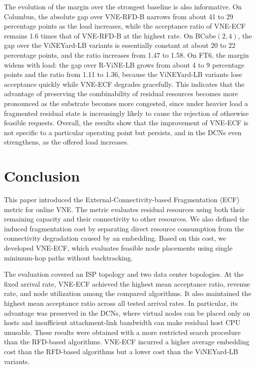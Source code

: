 \documentclass{ieeeaccess}
\newcommand{\ecf}{ECF}
\newcommand{\ecfvne}{VNE-ECF}
\begin{document}
The evolution of the margin over the strongest baseline is also informative. On Columbus, the
absolute gap over VNE-RFD-B narrows from about 41 to 29 percentage points as the load increases,
while the acceptance ratio of \ecfvne{} remains 1.6 times that of VNE-RFD-B at the highest rate. On
BCube$(2,4)$, the gap over the ViNEYard-LB variants is essentially constant at about 20 to 22 percentage
points, and the ratio increases from 1.47 to 1.58. On FT6, the margin widens with load: the gap
over R-ViNE-LB grows from about 4 to 9 percentage points and the ratio from 1.11 to 1.36, because the
ViNEYard-LB variants lose acceptance quickly while \ecfvne{} degrades gracefully. This indicates that
the advantage of preserving the combinability of residual resources becomes more pronounced as the
substrate becomes more congested, since under heavier load a fragmented residual state is
increasingly likely to cause the rejection of otherwise feasible requests. Overall, the results
show that the improvement of \ecfvne{} is not specific to a particular operating point but
persists, and in the DCNs even strengthens, as the offered load increases.

\section{Conclusion}
\label{sec:conclusion}

This paper introduced the External-Connectivity-based Fragmentation (\ecf{}) metric for online
VNE. The metric evaluates residual resources using both their remaining capacity and their
connectivity to other resources. We also defined the induced fragmentation cost by separating
direct resource consumption from the connectivity degradation caused by an embedding. Based on
this cost, we developed \ecfvne{}, which evaluates feasible node placements using single
minimum-hop paths without backtracking.

The evaluation covered an ISP topology and two data center topologies. At the fixed arrival rate,
\ecfvne{} achieved the highest mean acceptance ratio, revenue rate, and node utilization among the
compared algorithms. It also maintained the highest mean acceptance ratio across all tested arrival
rates. In particular, its advantage was preserved in the DCNs, where virtual nodes can be placed
only on hosts and insufficient attachment-link bandwidth can make residual host CPU unusable. These
results were obtained with a more restricted search procedure than the RFD-based algorithms.
\ecfvne{} incurred a higher average embedding cost than the RFD-based algorithms but a lower cost
than the ViNEYard-LB variants.
\end{document}
